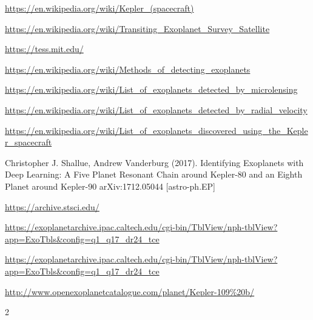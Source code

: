 \documentclass[twoside]{article}
\begin{document}
\begin{multicols}{2}
\begin{thebibliography}{99}
\url{https://en.wikipedia.org/wiki/Kepler_(spacecraft)}

\url{https://en.wikipedia.org/wiki/Transiting_Exoplanet_Survey_Satellite}

\url{https://tess.mit.edu/}

\url{https://en.wikipedia.org/wiki/Methods_of_detecting_exoplanets}

\url{https://en.wikipedia.org/wiki/List_of_exoplanets_detected_by_microlensing}

\url{https://en.wikipedia.org/wiki/List_of_exoplanets_detected_by_radial_velocity}

\url{https://en.wikipedia.org/wiki/List_of_exoplanets_discovered_using_the_Kepler_spacecraft}

Christopher J. Shallue, Andrew Vanderburg (2017).
\newblock Identifying Exoplanets with Deep Learning: A Five Planet Resonant Chain around Kepler-80 and an Eighth Planet around Kepler-90
\newblock arXiv:1712.05044 [astro-ph.EP]

\url{https://archive.stsci.edu/}

\url{https://exoplanetarchive.ipac.caltech.edu/cgi-bin/TblView/nph-tblView?app=ExoTbls&config=q1_q17_dr24_tce}

\url{https://exoplanetarchive.ipac.caltech.edu/cgi-bin/TblView/nph-tblView?app=ExoTbls&config=q1_q17_dr24_tce}
 
\url{http://www.openexoplanetcatalogue.com/planet/Kepler-109%20b/} 
\end{thebibliography}


\end{multicols}{2}
\end{document}
